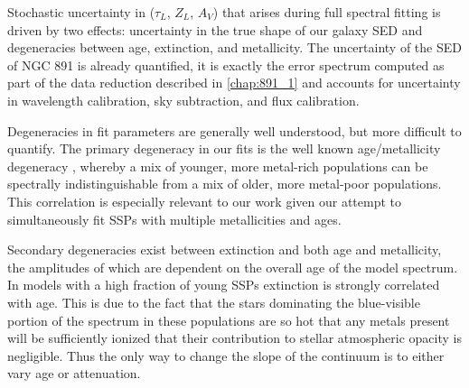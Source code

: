 Stochastic uncertainty in ($\tau_L$, $Z_L$, $A_V$) that arises during
full spectral fitting is driven by two effects: uncertainty in the
true shape of our galaxy SED and degeneracies between age, extinction,
and metallicity. The uncertainty of the SED of NGC 891 is already
quantified, it is exactly the error spectrum computed as part of the
data reduction described in \ref{chap:891_1} and accounts for
uncertainty in wavelength calibration, sky subtraction, and flux
calibration.


Degeneracies in fit parameters are generally well understood, but more
difficult to quantify. The primary degeneracy in our fits is the well
known age/metallicity degeneracy \citep[see, for
  example,][]{Oconnel76,Aaronson78,Worthey94,dePaz02}, whereby a mix
of younger, more metal-rich populations can be spectrally
indistinguishable from a mix of older, more metal-poor
populations. This correlation is especially relevant to our work given
our attempt to simultaneously fit SSPs with multiple metallicities and
ages.

Secondary degeneracies exist between extinction and both age and
metallicity, the amplitudes of which are dependent on the overall age
of the model spectrum. In models with a high fraction of young SSPs
extinction is strongly correlated with age. This is due to the fact
that the stars dominating the blue-visible portion of the spectrum in
these populations are so hot that any metals present will be
sufficiently ionized that their contribution to stellar atmospheric
opacity is negligible. Thus the only way to change the slope of the
continuum is to either vary age or attenuation.

